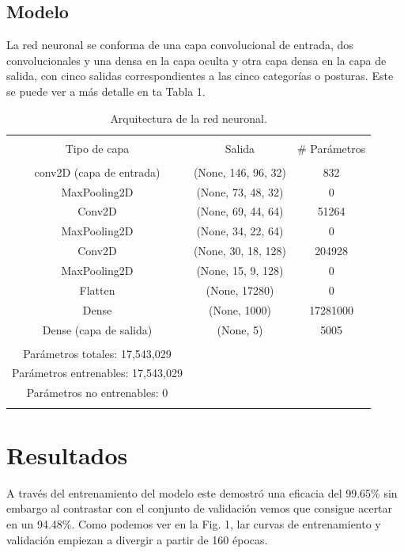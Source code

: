 \documentclass[journal]{IEEEtran}
\begin{document}
\subsection{Modelo}
La red neuronal se conforma de una capa convolucional de entrada, dos convolucionales y una densa en la capa oculta y otra capa densa en la capa de salida, con cinco salidas correspondientes a las cinco categorías o posturas. Este se puede ver a más detalle en ta Tabla 1.
\begin{table}[h!]
    \centering
    \begin{tabular}{c c c}
    \hline
    \\
    Tipo de capa & Salida & \# Parámetros\\
    \\
    \hline
     conv2D (capa de entrada) & (None, 146, 96, 32) & 832 \\
     MaxPooling2D & (None, 73, 48, 32) & 0 \\
     Conv2D & (None, 69, 44, 64) & 51264 \\  
     MaxPooling2D & (None, 34, 22, 64) & 0 \\
     Conv2D & (None, 30, 18, 128) & 204928 \\  
     MaxPooling2D & (None, 15, 9, 128) & 0 \\
     Flatten & (None, 17280) & 0 \\
     Dense & (None, 1000) & 17281000 \\
     Dense (capa de salida) & (None, 5) & 5005 \\
    \hline
    \\
    Parámetros totales: 17,543,029 \\
    Parámetros entrenables: 17,543,029 \\
    Parámetros no entrenables: 0 \\
    \hline
    \\
    \end{tabular}
    \caption{Arquitectura de la red neuronal.}
    \label{tab:1}
\end{table}

\section{Resultados}

A través del entrenamiento del modelo este demostró una eficacia del 99.65\% sin embargo al contrastar con el conjunto de validación vemos que consigue acertar en un 94.48\%. Como podemos ver en la Fig. 1, lar curvas de entrenamiento y validación empiezan a divergir a partir de 160 épocas. 
\end{document}
